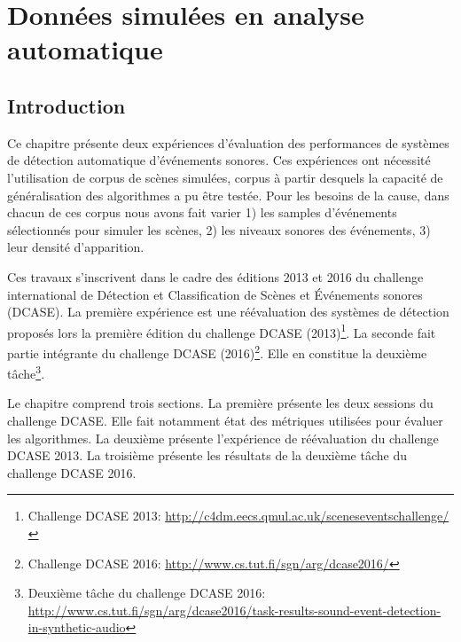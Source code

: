 \chapter[Données simulées en analyse automatique]{Données simulées en analyse automatique}\label{ch:ml_simuperf}


\section{Introduction}

Ce chapitre présente deux expériences d'évaluation des performances de systèmes de détection automatique d'événements sonores. Ces expériences ont nécessité l'utilisation de corpus de scènes simulées, corpus à partir desquels la capacité de généralisation des algorithmes a pu être testée. Pour les besoins de la cause, dans chacun de ces corpus nous avons fait varier 1) les samples d'événements sélectionnés pour simuler les scènes, 2) les niveaux sonores des événements, 3) leur densité d'apparition.

Ces travaux s'inscrivent dans le cadre des éditions 2013 et 2016 du challenge international de Détection et Classification de Scènes et Événements sonores (DCASE). La première expérience est une réévaluation des systèmes de détection proposés lors la première édition du challenge DCASE (2013)\footnote{Challenge DCASE 2013:  \url{http://c4dm.eecs.qmul.ac.uk/sceneseventschallenge/}}. La seconde fait partie intégrante du challenge DCASE (2016)\footnote{Challenge DCASE 2016:  \url{http://www.cs.tut.fi/sgn/arg/dcase2016/}}. Elle en constitue la deuxième tâche\footnote{Deuxième tâche du challenge DCASE 2016: \url{http://www.cs.tut.fi/sgn/arg/dcase2016/task-results-sound-event-detection-in-synthetic-audio}}.

Le chapitre comprend trois sections. La première présente les deux sessions du challenge DCASE. Elle fait notamment état des métriques utilisées pour évaluer les algorithmes. La deuxième présente l'expérience de réévaluation du challenge DCASE 2013. La troisième présente les résultats de la deuxième tâche du challenge DCASE 2016.

